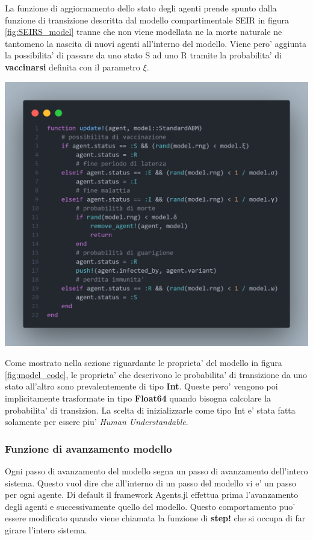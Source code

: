La funzione di aggiornamento dello stato degli agenti prende spunto dalla 
funzione di transizione descritta dal modello compartimentale SEIR in figura \ref{fig:SEIRS_model}
tranne che non viene modellata ne la morte naturale ne tantomeno la nascita di nuovi 
agenti all'interno del modello. Viene pero' aggiunta la possibilita' di passare
da uno stato S ad uno R tramite la probabilita' di \textbf{vaccinarsi} definita con il parametro $\xi$.

\begin{minipage}{\linewidth}
	\centering
	\includegraphics[width=\textwidth]{img/update_function.png}
	\label{fig:update_agent_function}
\end{minipage}

Come mostrato nella sezione riguardante le proprieta' del modello in figura \ref{fig:model_code},
le proprieta' che descrivono le probabilita' di transizione da uno stato all'altro sono prevalentemente
di tipo \textbf{Int}. Queste pero' vengono poi implicitamente trasformate in tipo \textbf{Float64} 
quando bisogna calcolare la probabilita' di transizion. La scelta di inizializzarle come 
tipo Int e' stata fatta solamente per essere piu' \emph{Human Understandable}.

\subsubsection*{Funzione di avanzamento modello}
Ogni passo di avanzamento del modello segna un passo di avanzamento dell'intero sistema. 
Questo vuol dire che all'interno di un passo del modello vi e' un passo per ogni agente. Di default
il framework Agents.jl effettua prima l'avanzamento degli agenti e successivamente quello del modello.
Questo comportamento puo' essere modificato quando viene chiamata la funzione di \textbf{step!} che 
si occupa di far girare l'intero sistema.

